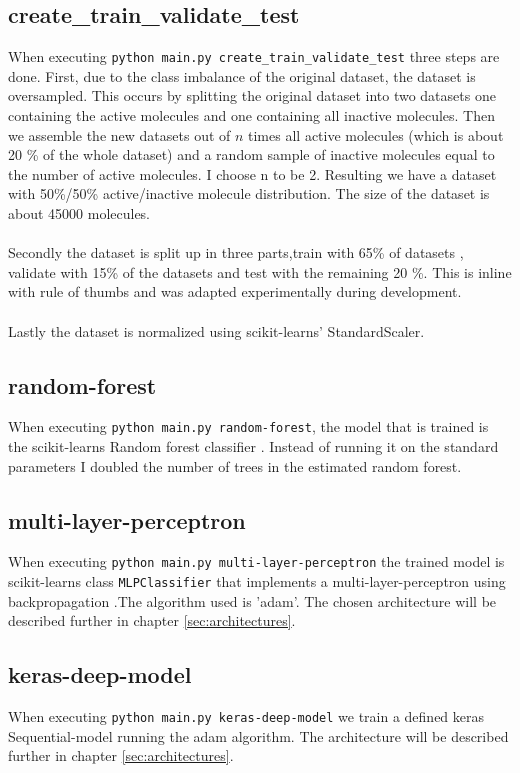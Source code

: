 \documentclass[12pt]{article}
\begin{document}
\subsection{create\_train\_validate\_test}
When executing \texttt{python main.py create\_train\_validate\_test} three steps are done. First, due to the class imbalance of the original dataset, the dataset is oversampled. This occurs by splitting the original dataset into two datasets one containing the active molecules and one containing all inactive molecules. Then we assemble the new datasets out of $n$ times all active molecules (which is about 20 \% of the whole dataset) and a random sample of inactive molecules equal to the number of active molecules. I choose n to be 2. Resulting we have a dataset with 50\%/50\% active/inactive molecule distribution. The size of the dataset is about 45000 molecules.\\\\
%
Secondly the dataset is split up in three parts,train with 65\% of datasets , validate with 15\% of the datasets and test with the remaining 20 \%.  This is inline with rule of thumbs and was adapted experimentally during development.\\\\
%
Lastly the dataset is normalized using scikit-learns' StandardScaler.

\subsection{random-forest}
When executing \texttt{python main.py random-forest}, the model that is trained is the scikit-learns Random forest classifier \cite{RandomForest}. Instead of running it on the standard parameters I doubled the number of trees in the estimated random forest.

\subsection{multi-layer-perceptron}
When executing \texttt{python main.py multi-layer-perceptron} the trained model is scikit-learns class \texttt{MLPClassifier} that implements a multi-layer-perceptron using backpropagation \cite{MLPclassifier}.The algorithm used is 'adam'. The chosen architecture will be described further in chapter \ref{sec:architectures}.

\subsection{keras-deep-model}
When executing \texttt{python main.py keras-deep-model} we train a defined keras Sequential-model running the adam algorithm. The architecture will be described further in chapter \ref{sec:architectures}. 
\end{document}
